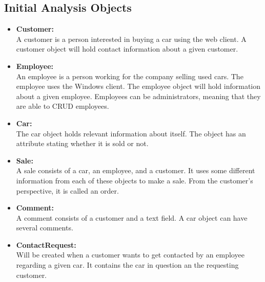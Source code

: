 \subsection{Initial Analysis Objects}
\begin{itemize}
    \item \textbf{Customer:}\\
    A customer is a person interested in buying a car using the web client. A customer object will hold contact information about a given customer.
    \item \textbf{Employee:}\\
    An employee is a person working for the company selling used cars. The employee uses the Windows client. The employee object will hold information about a given employee. Employees can be administrators, meaning that they are able to CRUD employees.
    \item \textbf{Car:}\\
    The car object holds relevant information about itself. The object has an attribute stating whether it is sold or not.
    \item \textbf{Sale:}\\
    A sale consists of a car, an employee, and a customer. It uses some different information from each of these objects to make a sale. From the customer's perspective, it is called an order.
    \item \textbf{Comment:}\\
    A comment consists of a customer and a text field. A car object can have several comments.
    \item \textbf{ContactRequest:}\\
    Will be created when a customer wants to get contacted by an employee regarding a given car. It contains the car in question an the requesting customer.
\end{itemize}
